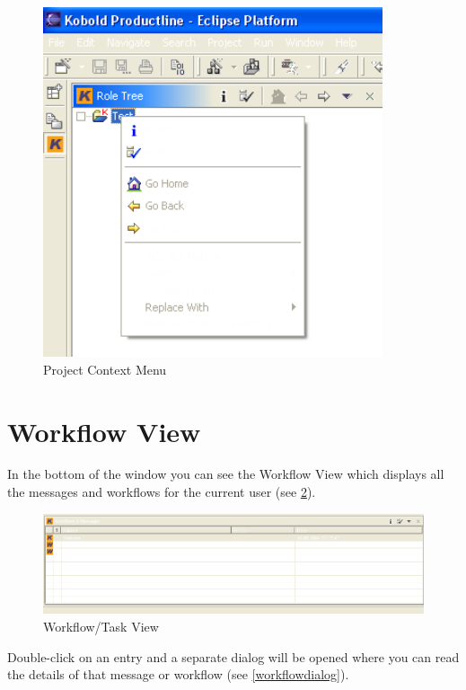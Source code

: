 \begin{figure}[h!]
\begin{center}
\includegraphics[width=10cm]{rolekontext.png}
   \caption{Project Context Menu}
\label{rolekontext}
\end{center}
\end{figure}\par



\section{Workflow View}

In the bottom of the window you can see the Workflow View which displays all 
the messages and workflows for the current user (see \ref{workflow}). 

\begin{figure}[h!]
\begin{center}
\includegraphics[width=15cm]{workflow.png}
   \caption{Workflow/Task View}
\label{workflow}
\end{center}
\end{figure}\par

Double-click on an entry and a 
separate dialog will be opened where you can read the details of that message or
workflow (see \ref{workflowdialog}).

